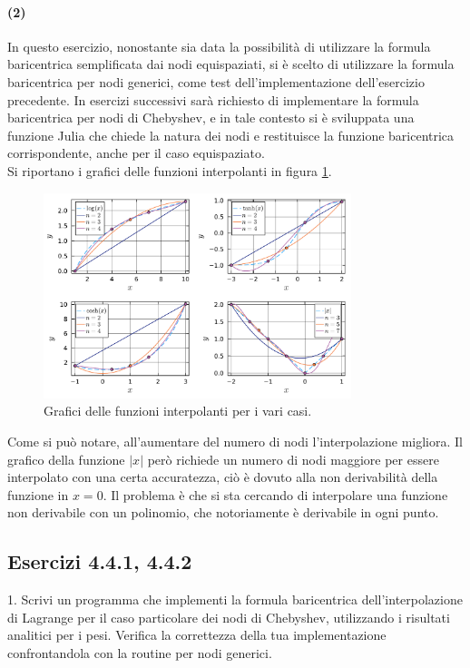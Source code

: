 \documentclass[letterpaper, 12pt]{article}
\begin{document}
\paragraph{(2) } In questo esercizio, nonostante sia data la possibilità di utilizzare la formula baricentrica
semplificata dai nodi equispaziati, si è scelto di utilizzare la formula baricentrica per nodi generici, come
test dell'implementazione dell'esercizio precedente. In esercizi successivi sarà richiesto di implementare
la formula baricentrica per nodi di Chebyshev, e in tale contesto si è sviluppata una funzione Julia che
chiede la natura dei nodi e restituisce la funzione baricentrica corrispondente, anche per il caso equispaziato. \\
Si riportano i grafici delle funzioni interpolanti in figura \ref{fig:es4_2_2_1}.
\begin{figure}[!ht]
    \centering
    \includegraphics[width=0.8\textwidth]{4221.pdf}
    \caption{Grafici delle funzioni interpolanti per i vari casi.}
    \label{fig:es4_2_2_1}
\end{figure}

Come si può notare, all'aumentare del numero di nodi l'interpolazione migliora. Il grafico della funzione $|x|$
però richiede un numero di nodi maggiore per essere interpolato con una certa accuratezza, ciò è dovuto alla
non derivabilità della funzione in $x=0$. Il problema è che si sta cercando di interpolare una funzione
non derivabile con un polinomio, che notoriamente è derivabile in ogni punto.

\subsection{Esercizi 4.4.1, 4.4.2}
1. Scrivi un programma che implementi la formula baricentrica dell'interpolazione di Lagrange 
per il caso particolare dei nodi di Chebyshev, utilizzando i risultati analitici per i pesi. 
Verifica la correttezza della tua implementazione confrontandola con la routine per nodi generici. \\
\end{document}
